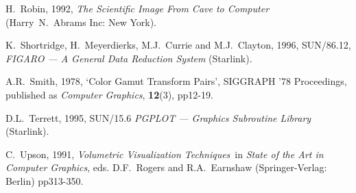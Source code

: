 \begin{thebibliography}{99}
   H.~Robin, 1992, {\it The Scientific Image From Cave
   to Computer}\, (Harry~N.~Abrams Inc: New York).

   K.~Shortridge, H.~Meyerdierks, M.J.~Currie and
   M.J.~Clayton, 1996, SUN/86.12, {\it FIGARO --- A General Data
   Reduction System} (Starlink).

   A.R.~Smith, 1978, `Color Gamut Transform Pairs',
   SIGGRAPH '78 Proceedings, published as {\it Computer Graphics},
   {\bf 12}(3), pp12-19.

   D.L.~Terrett, 1995, SUN/15.6 {\it PGPLOT ---
   Graphics Subroutine Library}\, (Starlink).

   C.~Upson, 1991, {\it Volumetric Visualization
   Techniques}\, in {\it State of the Art in Computer Graphics},
   eds. D.F.~Rogers and R.A.~Earnshaw (Springer-Verlag: Berlin)
   pp313-350.

\end{thebibliography}

\typeout{  }
\typeout{*****************************************************}
\typeout{  }
\typeout{  }
\typeout{*****************************************************}
\typeout{  }


